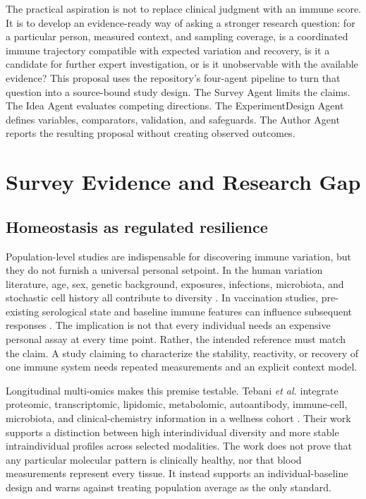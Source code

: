 \documentclass[conference]{IEEEtran}
\begin{document}
The practical aspiration is not to replace clinical judgment with an immune score. It is to develop an evidence-ready way of asking a stronger research question: for a particular person, measured context, and sampling coverage, is a coordinated immune trajectory compatible with expected variation and recovery, is it a candidate for further expert investigation, or is it unobservable with the available evidence? This proposal uses the repository's four-agent pipeline to turn that question into a source-bound study design. The Survey Agent limits the claims. The Idea Agent evaluates competing directions. The ExperimentDesign Agent defines variables, comparators, validation, and safeguards. The Author Agent reports the resulting proposal without creating observed outcomes.

\section{Survey Evidence and Research Gap}

\subsection{Homeostasis as regulated resilience}

Population-level studies are indispensable for discovering immune variation, but they do not furnish a universal personal setpoint. In the human variation literature, age, sex, genetic background, exposures, infections, microbiota, and stochastic cell history all contribute to diversity \cite{brodin2017}. In vaccination studies, pre-existing serological state and baseline immune features can influence subsequent responses \cite{tsang2014}. The implication is not that every individual needs an expensive personal assay at every time point. Rather, the intended reference must match the claim. A study claiming to characterize the stability, reactivity, or recovery of one immune system needs repeated measurements and an explicit context model.

Longitudinal multi-omics makes this premise testable. Tebani \emph{et al.} integrate proteomic, transcriptomic, lipidomic, metabolomic, autoantibody, immune-cell, microbiota, and clinical-chemistry information in a wellness cohort \cite{tebani2020}. Their work supports a distinction between high interindividual diversity and more stable intraindividual profiles across selected modalities. The work does not prove that any particular molecular pattern is clinically healthy, nor that blood measurements represent every tissue. It instead supports an individual-baseline design and warns against treating population average as the only standard.
\end{document}
